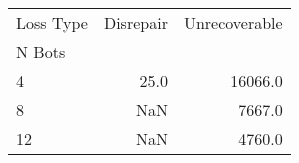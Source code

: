 \begin{tabular}{lrr}
\toprule
Loss Type &  Disrepair &  Unrecoverable \\
N Bots &            &                \\
\midrule
4      &       25.0 &        16066.0 \\
8      &        NaN &         7667.0 \\
12     &        NaN &         4760.0 \\
\bottomrule
\end{tabular}
